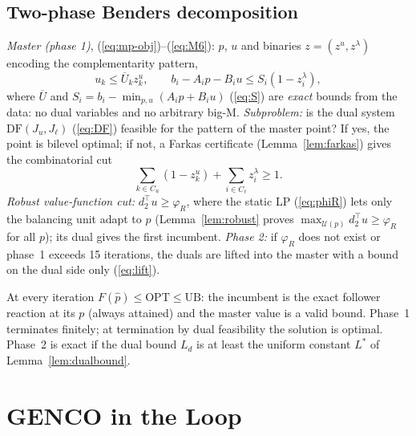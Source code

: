 \subsection{Two-phase Benders decomposition}
\emph{Master (phase 1)}, (\ref{eq:mp-obj})--(\ref{eq:M6}): $p$, $u$ and binaries
$z=(z^u,z^\lambda)$ encoding the complementarity pattern,
\begin{equation}
u_k\le\overline U_kz^u_k,\qquad b_i-A_ip-B_iu\le S_i(1-z^\lambda_i),
\label{eq:mp-short}
\end{equation}
where $\overline U$ and $S_i=b_i-\min_{p,u}(A_ip+B_iu)$ (\ref{eq:S}) are \emph{exact} bounds
from the data: no dual variables and no arbitrary big-M. \emph{Subproblem:} is the dual
system $\mathrm{DF}(J_u,J_\ell)$ (\ref{eq:DF}) feasible for the pattern of the master point?
If yes, the point is bilevel optimal; if not, a Farkas certificate (Lemma~\ref{lem:farkas})
gives the combinatorial cut~\cite{codato2006}
\begin{equation}
\textstyle\sum_{k\in C_u}(1-z^u_k)+\sum_{i\in C_\ell}z^\lambda_i\ge1 .
\label{eq:cut-short}
\end{equation}
\emph{Robust value-function cut:} $d_2^\top u\ge\varphi_R$, where the static LP
(\ref{eq:phiR}) lets only the balancing unit adapt to $p$ (Lemma~\ref{lem:robust} proves
$\max_{\mathcal U(p)}d_2^\top u\ge\varphi_R$ for all $p$); its dual gives the first incumbent.
\emph{Phase 2:} if $\varphi_R$ does not exist or phase~1 exceeds 15 iterations, the duals
are lifted into the master with a bound on the dual side only (\ref{eq:lift}).

\begin{theorem}\label{thm:main-benders}
At every iteration $F(\hat p)\le\mathrm{OPT}\le\mathrm{UB}$: the incumbent is the exact
follower reaction at its $p$ (always attained) and the master value is a valid bound.
Phase~1 terminates finitely; at termination by dual feasibility the solution is
optimal. Phase~2 is exact if the dual bound $L_d$ is at least the uniform constant $L^\ast$
of Lemma~\ref{lem:dualbound}.
\end{theorem}

\section{GENCO in the Loop}
\label{sec:genco}
